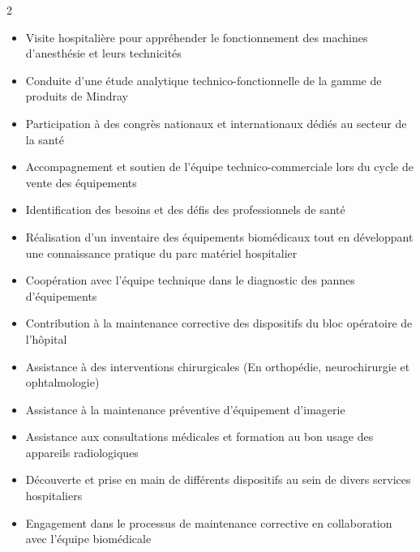 \documentclass[8pt,a4paper]{altacv}
\begin{document}
\begin{paracol}{2}
\begin{itemize}
  \item Visite hospitalière pour appréhender le fonctionnement des machines d'anesthésie et leurs technicités
  \item Conduite d’une étude analytique technico-fonctionnelle de la gamme de produits de Mindray
  \item Participation à des congrès nationaux et internationaux dédiés au secteur de la santé
  \item Accompagnement et soutien de l’équipe technico-commerciale lors du cycle de vente des équipements
  \item Identification des besoins et des défis des professionnels de santé
\end{itemize}
\vspace{2pt}
\begin{itemize}
  \item Réalisation d’un inventaire des équipements biomédicaux tout en développant une connaissance pratique du parc matériel hospitalier
  \item Coopération avec l’équipe technique dans le diagnostic des pannes d’équipements
  \item Contribution à la maintenance corrective des dispositifs du bloc opératoire de l’hôpital
  \item Assistance à des interventions chirurgicales (En orthopédie, neurochirurgie et ophtalmologie)
\end{itemize}
\vspace{2pt}
\begin{itemize}
  \item Assistance à la maintenance préventive d’équipement d’imagerie
  \item Assistance aux consultations médicales et formation au bon usage des appareils radiologiques
\end{itemize}
\vspace{2pt}
\begin{itemize}
  \item Découverte et prise en main de différents dispositifs au sein de divers services hospitaliers
  \item Engagement dans le processus de maintenance corrective en collaboration avec l’équipe biomédicale
\end{itemize}


\end{paracol}
\end{document}
